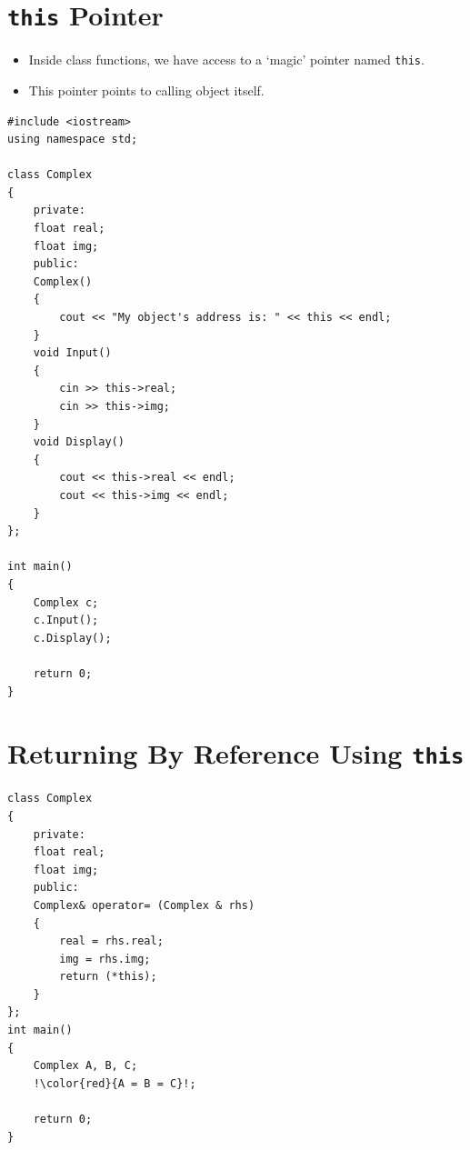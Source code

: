 \documentclass[12pt,a4paper]{article}
\begin{document}
\section{\texttt{this} Pointer}
\begin{itemize}
\item Inside class functions, we have access to a `magic' pointer named \verb|this|.
\item This pointer points to calling object itself.
\end{itemize}
\begin{lstlisting}[caption={\texttt{this} pointer}]
#include <iostream>
using namespace std;

class Complex
{
	private:
	float real;
	float img;
	public:
	Complex()
	{
		cout << "My object's address is: " << this << endl;
	}
	void Input()
	{
		cin >> this->real;
		cin >> this->img;
	}
	void Display()
	{
		cout << this->real << endl;
		cout << this->img << endl;
	}
};

int main()
{
	Complex c;
	c.Input();
	c.Display();

	return 0;
}
\end{lstlisting}
\section{Returning By Reference Using \texttt{this}}
\begin{lstlisting}[caption={Returning by reference using \texttt{this} pointer},escapechar=!]
class Complex
{
	private:
	float real;
	float img;
	public:
	Complex& operator= (Complex & rhs)
	{
		real = rhs.real;
		img = rhs.img;
		return (*this);
	}
};
int main()
{
	Complex A, B, C;
	!\color{red}{A = B = C}!;

	return 0;
}
\end{lstlisting}
\end{document}
